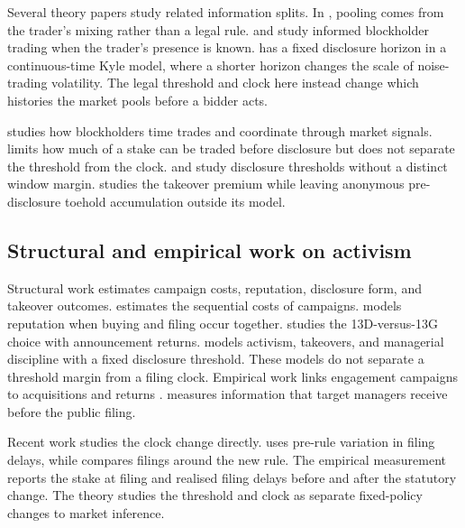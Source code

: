\documentclass[11pt]{article}
\begin{document}
Several theory papers study related information splits. In \citet{KyleVila1991}, pooling comes
from the trader's mixing rather than a legal rule. \citet{CollinDufresneFos2015} and
\citet{CollinDufresneFos2016} study informed blockholder trading when the trader's presence is
known. \citet{BackEtAl2018} has a fixed disclosure horizon in a continuous-time Kyle model, where
a shorter horizon changes the scale of noise-trading volatility. The legal threshold and clock
here instead change which histories the market pools before a bidder acts.

\citet{CetemenCisternasKolbViswanathan2026} studies how blockholders time trades and coordinate
through market signals. \citet{Corum2025} limits how much of a stake can be traded before
disclosure but does not separate the threshold from the clock. \citet{CorumLevit2019} and
\citet{OrdonezCalafiBernhardt2022} study disclosure thresholds without a distinct window margin.
\citet{BurkartLee2022} studies the takeover premium while leaving anonymous pre-disclosure
toehold accumulation outside its model.

\subsection{Structural and empirical work on activism}
\label{sec:lit-structural}

Structural work estimates campaign costs, reputation, disclosure form, and takeover outcomes.
\citet{Gantchev2013} estimates the sequential costs of campaigns. \citet{JohnsonSwem2021} models
reputation when buying and filing occur together. \citet{AlbuquerqueFosSchroth2022} studies the
13D-versus-13G choice with announcement returns. \citet{CelentanoLevine2025} models activism,
takeovers, and managerial discipline with a fixed disclosure threshold. These models do not
separate a threshold margin from a filing clock. Empirical work links engagement campaigns to
acquisitions and returns \citep{BravJiangPartnoyThomas2008,GreenwoodSchor2009,
BechtFranksGrantWagner2017}. \citet{Zeng2026} measures information that target managers receive
before the public filing.

Recent work studies the clock change directly. \citet{PolkBuchheitRileyStone2024} uses pre-rule
variation in filing delays, while \citet{Trivedi2026} compares filings around the new rule. The
empirical measurement reports the stake at filing and realised filing delays before and after the
statutory change. The theory studies the threshold and clock as separate fixed-policy changes to
market inference.
\end{document}
